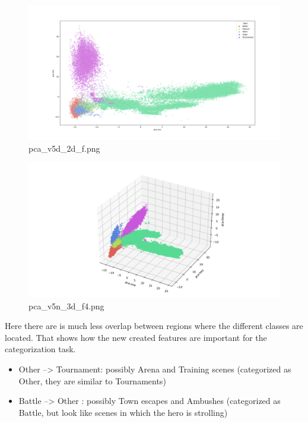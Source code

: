 \documentclass[
]{article}
\providecommand{\tightlist}{%
  \setlength{\itemsep}{0pt}\setlength{\parskip}{0pt}}
\begin{document}
\begin{figure}
\centering
\includegraphics{visualizations/pca_v5n_2d_f.png}
\caption{pca\_v5d\_2d\_f.png}
\end{figure}

\begin{figure}
\centering
\includegraphics{visualizations/pca_v5n_3d_f4.png}
\caption{pca\_v5n\_3d\_f4.png}
\end{figure}

Here there are is much less overlap between regions where the different
classes are located. That shows how the new created features are
important for the categorization task.

\begin{itemize}
\tightlist
\item
  Other --\textgreater{} Tournament: possibly Arena and Training scenes
  (categorized as Other, they are similar to Tournaments)
\item
  Battle --\textgreater{} Other : possibly Town escapes and Ambushes
  (categorized as Battle, but look like scenes in which the hero is
  strolling)
\end{itemize}
\end{document}
